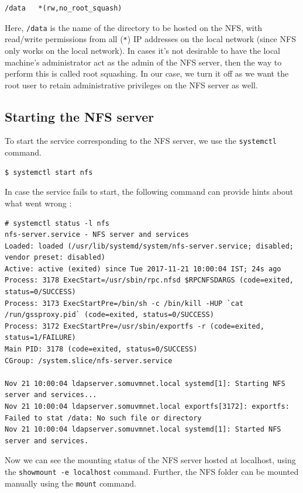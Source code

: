 \begin{verbatim}
/data	*(rw,no_root_squash)	
\end{verbatim}
\vspace{-10pt}

\noindent
Here, \verb|/data| is the name of the directory to be hosted on the NFS, with read/write permissions from all (\verb|*|) IP addresses on the local network (since NFS only works on the local network). In cases it's not desirable to have the local machine's administrator act as the admin of the NFS server, then the way to perform this is called root squashing. In our case, we turn it off as we want the root user to retain administrative privileges on the NFS server as well. 

\subsection{Starting the NFS server}
To start the service corresponding to the NFS server, we use the \verb|systemctl| command. 

\begin{verbatim}
$ systemctl start nfs
\end{verbatim}

\noindent
In case the service fails to start, the following command can provide hints about what went wrong :

\begin{verbatim}
# systemctl status -l nfs
nfs-server.service - NFS server and services
Loaded: loaded (/usr/lib/systemd/system/nfs-server.service; disabled; vendor preset: disabled)
Active: active (exited) since Tue 2017-11-21 10:00:04 IST; 24s ago
Process: 3178 ExecStart=/usr/sbin/rpc.nfsd $RPCNFSDARGS (code=exited, status=0/SUCCESS)
Process: 3173 ExecStartPre=/bin/sh -c /bin/kill -HUP `cat /run/gssproxy.pid` (code=exited, status=0/SUCCESS)
Process: 3172 ExecStartPre=/usr/sbin/exportfs -r (code=exited, status=1/FAILURE)
Main PID: 3178 (code=exited, status=0/SUCCESS)
CGroup: /system.slice/nfs-server.service

Nov 21 10:00:04 ldapserver.somuvmnet.local systemd[1]: Starting NFS server and services...
Nov 21 10:00:04 ldapserver.somuvmnet.local exportfs[3172]: exportfs: Failed to stat /data: No such file or directory
Nov 21 10:00:04 ldapserver.somuvmnet.local systemd[1]: Started NFS server and services.
\end{verbatim}
\vspace{-10pt}

Now we can see the mounting status of the NFS server hosted at localhost, using the \verb|showmount -e localhost| command. Further, the NFS folder can be mounted manually using the \verb|mount| command. 

